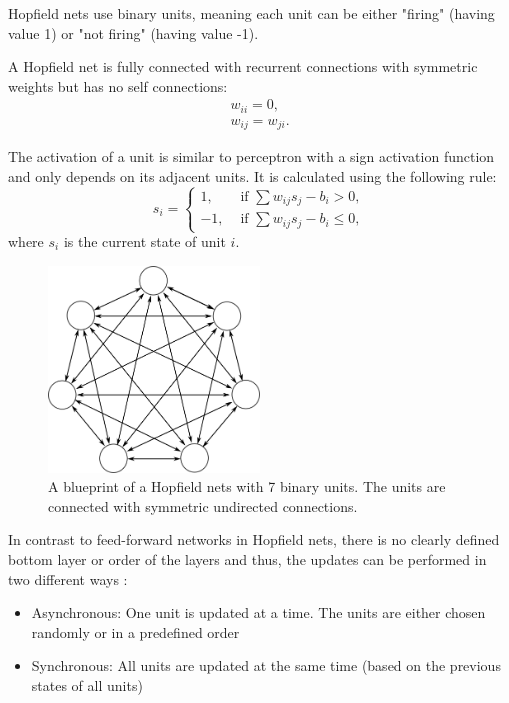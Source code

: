 Hopfield nets use binary units, meaning each unit can be either "firing" (having value 1) or "not firing" (having value -1). 

A Hopfield net  is fully connected with recurrent connections with symmetric weights but has no self connections:
\[
\begin{split}
w_{ii} = 0 , \\
w_{ij} = w_{ji} .
\end{split}
\]

The activation of a unit is similar to perceptron with a sign activation function and only depends on its adjacent units. It is calculated using the following rule:
\[
	s_i = 
		\begin{cases}
			1, & \text{  if  } \sum w_{ij} s_{j} - b_{i}> 0 , \\
			-1, & \text{  if  } \sum w_{ij} s_{j} - b_{i} \le 0,
		\end{cases}	
\]
where $s_i$ is the current state of unit $i$.

\begin{figure}
	\centering
    	\includegraphics[width=0.5\textwidth]{imgs/hopfield.png} 
    \caption[A blueprint of a Hopfield nets with 7 binary units.]{A blueprint of a Hopfield nets with 7 binary units. The units are connected with symmetric undirected connections.}
	\label{fig:hopfiled}
\end{figure}


In contrast to feed-forward networks in Hopfield nets, there is no clearly defined bottom layer or order of the layers and thus, the updates can be performed in two different ways :
\begin{itemize}
\item Asynchronous: One unit is updated at a time. The units are either chosen randomly or in a predefined order
\item Synchronous: All units are updated at the same time (based on the previous states of all units)
\end{itemize}

